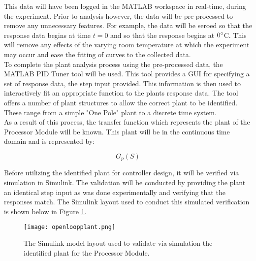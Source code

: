 This data will have been logged in the MATLAB workspace in real-time, during the experiment. Prior to analysis however, the data will be pre-processed to remove any unnecessary features. For example, the data will be seroed so that the response data begins at time $t = 0$ and so that the response begins at $0\degree$C. This will remove any effects of the varying room temperature at which the experiment may occur and ease the fitting of curves to the collected data.\\

To complete the plant analysis process using the pre-processed data, the MATLAB PID Tuner tool will be used. This tool provides a GUI for specifying a set of response data, the step input provided. This information is then used to interactively fit an appropriate function to the plants response data. The tool offers a number of plant structures to allow the correct plant to be identified. These range from a simple "One Pole" plant to a discrete time system.\\

As a result of this process, the transfer function which represents the plant of the Processor Module will be known. This plant will be in the continuous time domain and is represented by:

$$G_p(S)$$

Before utilizing the identified plant for controller design, it will be verified via simulation in Simulink. The validation will be conducted by providing the plant an identical step input as was done experimentally and verifying that the responses match. The Simulink layout used to conduct this simulated verification is shown below in Figure \ref{fig:openloopplant}.\\

\begin{figure}[!htb]
	\centering
	\texttt{[image: openloopplant.png]}
	\caption[Open loop plant valiation Simulink Model.]{The Simulink model layout used to validate via simulation the identified plant for the Processor Module.}
	\label{fig:openloopplant}
\end{figure} 
\FloatBarrier

